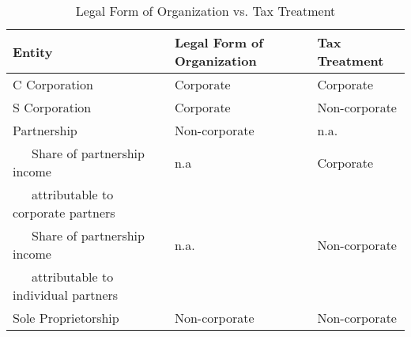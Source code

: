 \documentclass[article,11pt,letterpaper,fleqn]{article}
\theoremstyle{definition}
\numberwithin{equation}{section}
\begin{document}
\begin{table}[htbp]
  \centering
  \caption{Legal Form of Organization vs. Tax Treatment}
    \begin{tabular}{lll}
    \hline
    \hline
    Entity & Legal Form of Organization & Tax Treatment \\
   \hline
    C Corporation & Corporate & Corporate \\
    S Corporation & Corporate & Non-corporate \\
    Partnership & Non-corporate & n.a. \\
    \ \ \ Share of partnership income & n.a   & Corporate \\
    \ \ \ attributable to corporate partners & &  \\
    \ \ \ Share of partnership income& n.a.  & Non-corporate \\
    \ \ \ attributable to individual partners &  &  \\
    Sole Proprietorship & Non-corporate & Non-corporate \\
    \hline
    \hline
    \end{tabular}%
  \label{tab:org_form}%
\end{table}%



\end{document}
